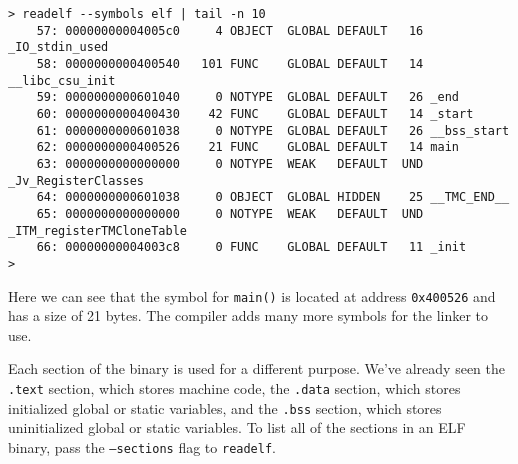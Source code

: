 \documentclass{article}
\begin{document}
\begin{lstlisting}
> readelf --symbols elf | tail -n 10
    57: 00000000004005c0     4 OBJECT  GLOBAL DEFAULT   16 _IO_stdin_used
    58: 0000000000400540   101 FUNC    GLOBAL DEFAULT   14 __libc_csu_init
    59: 0000000000601040     0 NOTYPE  GLOBAL DEFAULT   26 _end
    60: 0000000000400430    42 FUNC    GLOBAL DEFAULT   14 _start
    61: 0000000000601038     0 NOTYPE  GLOBAL DEFAULT   26 __bss_start
    62: 0000000000400526    21 FUNC    GLOBAL DEFAULT   14 main
    63: 0000000000000000     0 NOTYPE  WEAK   DEFAULT  UND _Jv_RegisterClasses
    64: 0000000000601038     0 OBJECT  GLOBAL HIDDEN    25 __TMC_END__
    65: 0000000000000000     0 NOTYPE  WEAK   DEFAULT  UND _ITM_registerTMCloneTable
    66: 00000000004003c8     0 FUNC    GLOBAL DEFAULT   11 _init
> 
\end{lstlisting}

Here we can see that the symbol for \texttt{main()} is located at address
\texttt{0x400526} and has a size of 21 bytes. The compiler adds many more
symbols for the linker to use.

Each section of the binary is used for a different purpose. We've already seen
the  \texttt{.text} section, which stores machine code, the \texttt{.data}
section, which stores initialized global or static variables, and the
\texttt{.bss} section, which stores uninitialized global or static variables. To
list all of the sections in an ELF binary, pass the \texttt{--sections} flag to
\texttt{readelf}.
\end{document}
